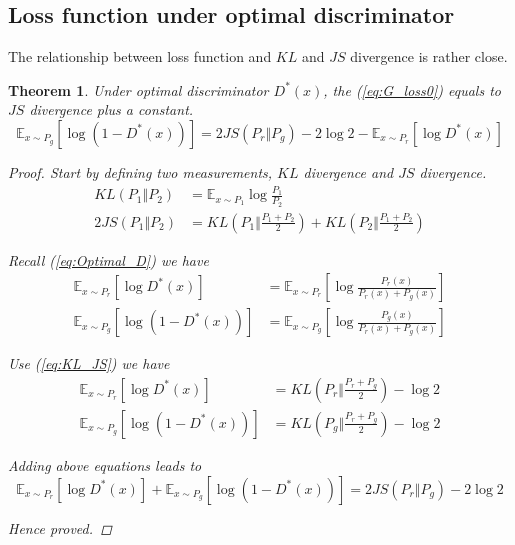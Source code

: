 \documentclass[a4paper]{article}
\newtheorem{theorem}{Theorem}[section]
\begin{document}
\subsection{Loss function under optimal discriminator}

The relationship between loss function and $KL$ and $JS$ divergence is rather close.

\begin{theorem} \label{th:JS_Gloss}
    Under optimal discriminator $D^*(x)$, the (\ref{eq:G_loss0}) equals to $JS$ divergence plus a constant.
    \begin{equation*}
        \mathbb{E}_{x\sim P_g} [\log{(1-D^*(x))}]
        = 2 JS(P_r \Vert P_g) - 2 \log{2}
        - \mathbb{E}_{x\sim P_r} [\log{D^*(x)}]
    \end{equation*}

    \begin{proof}
        Start by defining two measurements, $KL$ divergence and $JS$ divergence.
        \begin{equation} \label{eq:KL_JS}
            \begin{aligned}
                KL(P_1 \Vert P_2)   & = \mathbb{E}_{x\sim P_1} \log{\frac{P_1}{P_2}}                      \\
                2 JS(P_1 \Vert P_2) & = KL(P_1 \Vert \frac{P_1+P_2}{2}) + KL(P_2 \Vert \frac{P_1+P_2}{2})
            \end{aligned}
        \end{equation}

        Recall (\ref{eq:Optimal_D}) we have
        \begin{equation*}
            \begin{aligned}
                \mathbb{E}_{x\sim P_r}[\log{D^*(x)}]     & = \mathbb{E}_{x\sim P_r}[\log{\frac{P_r(x)}{P_r(x)+ P_g(x)}}] \\
                \mathbb{E}_{x\sim P_g}[\log{(1-D^*(x))}] & = \mathbb{E}_{x\sim P_g}[\log{\frac{P_g(x)}{P_r(x)+ P_g(x)}}]
            \end{aligned}
        \end{equation*}

        Use (\ref{eq:KL_JS}) we have
        \begin{equation*}
            \begin{aligned}
                \mathbb{E}_{x\sim P_r}[\log{D^*(x)}]     & = KL(P_r \Vert \frac{P_r+P_g}{2}) - \log{2} \\
                \mathbb{E}_{x\sim P_g}[\log{(1-D^*(x))}] & = KL(P_g \Vert \frac{P_r+P_g}{2}) - \log{2}
            \end{aligned}
        \end{equation*}

        Adding above equations leads to
        \begin{equation*}
            \mathbb{E}_{x\sim P_r}[\log{D^*(x)}] + \mathbb{E}_{x\sim P_g}[\log{(1-D^*(x))}]
            = 2 JS(P_r \Vert P_g) - 2 \log{2}
        \end{equation*}

        Hence proved.
    \end{proof}

\end{theorem}
\end{document}
